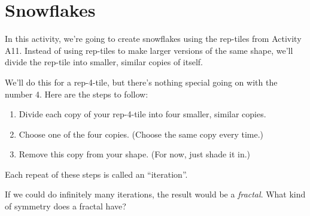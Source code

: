 \newpage
\section{Snowflakes}

In this activity, we're going to create snowflakes using the rep-tiles from Activity A11.  Instead of using rep-tiles to make larger versions of the same shape, we'll divide the rep-tile into smaller, similar copies of itself.

We'll do this for a rep-4-tile, but there's nothing special going on with the number 4.  Here are the steps to follow:
\begin{enumerate}
	\item Divide each copy of your rep-4-tile into four smaller, similar copies.
	\item Choose one of the four copies.  (Choose the same copy every time.)
	\item Remove this copy from your shape.  (For now, just shade it in.)
\end{enumerate}
  Each repeat of these steps is called an ``iteration''.
  
If we could do infinitely many iterations, the result would be a \textit{fractal}.  What kind of symmetry does a fractal have?


